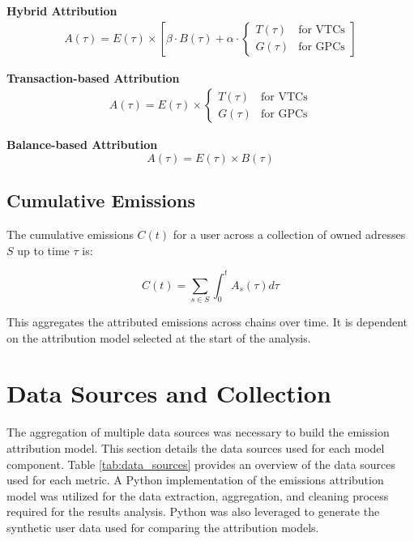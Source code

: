 \documentclass[11pt]{report}
\begin{document}
\textbf{Hybrid Attribution}
\begin{align}
    A(\tau) = E(\tau) \times \left[\beta \cdot B(\tau) + \alpha \cdot \begin{cases}
                                                                              T(\tau) & \text{for VTCs} \\
                                                                              G(\tau) & \text{for GPCs}
                                                                          \end{cases}\right]
\end{align}

\textbf{Transaction-based Attribution}
\begin{align}
    A(\tau) = E(\tau) \times \begin{cases}
                                 T(\tau) & \text{for VTCs} \\
                                 G(\tau) & \text{for GPCs}
                             \end{cases}
\end{align}

\textbf{Balance-based Attribution}
\begin{equation}
    A(\tau) = E(\tau) \times B(\tau)
\end{equation}

\subsection*{Cumulative Emissions}

The cumulative emissions $C(t)$ for a user across a collection of owned adresses $S$ up to time $\tau$ is:

\begin{equation}
    C(t) = \sum_{s \in S} \int_{0}^{t} A_s(\tau) d\tau
\end{equation}

This aggregates the attributed emissions across chains over time. It is dependent on the attribution model selected at the start of the analysis.

\section{Data Sources and Collection \label{sec:data_sources}}

The aggregation of multiple data sources was necessary to build the emission attribution model. This section details the data sources used for each model component. Table \ref{tab:data_sources} provides an overview of the data sources used for each metric. A Python implementation of the emissions attribution model was utilized for the data extraction, aggregation, and cleaning process required for the results analysis. Python was also leveraged to generate the synthetic user data used for comparing the attribution models.
\end{document}
